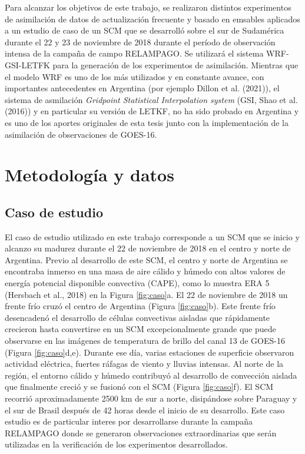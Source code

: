 \documentclass[12pt,oneside]{reedthesis}
\begin{document}
Para alcanzar los objetivos de este trabajo, se realizaron distintos experimentos de asimilación de datos de actualización frecuente y basado en emsables aplicados a un estudio de caso de un SCM que se desarrolló sobre el sur de Sudamérica durante el 22 y 23 de noviembre de 2018 durante el período de observación intensa de la campaña de campo RELAMPAGO. Se utilizará el sistema WRF-GSI-LETFK para la generación de los experimentos de asimilación. Mientras que el modelo WRF es uno de los más utilizados y en constante avance, con importantes antecedentes en Argentina (por ejemplo Dillon et al. (2021)), el sistema de asmilación \emph{Gridpoint Statistical Interpolation system} (GSI, Shao et al. (2016)) y en particular su versión de LETKF, no ha sido probado en Argentina y es uno de los aportes originales de esta tesis junto con la implementación de la asimilación de observaciones de GOES-16.

\hypertarget{metodologuxeda-y-datos}{%
\chapter{Metodología y datos}\label{metodologuxeda-y-datos}}

\hypertarget{caso-de-estudio}{%
\section{Caso de estudio}\label{caso-de-estudio}}

El caso de estudio utilizado en este trabajo corresponde a un SCM que se inicio y alcanzo su madurez durante el 22 de noviembre de 2018 en el centro y norte de Argentina. Previo al desarrollo de este SCM, el centro y norte de Argentina se encontraba inmerso en una masa de aire cálido y húmedo con altos valores de energía potencial disponible convectiva (CAPE), como lo muestra ERA 5 (Hersbach et al., 2018) en la Figura \ref{fig:caso}a. El 22 de noviembre de 2018 un frente frío cruzó el centro de Argentina (Figura \ref{fig:caso}b). Este frente frío desencadenó el desarrollo de células convectivas aisladas que rápidamente crecieron hasta convertirse en un SCM excepcionalmente grande que puede observarse en las imágenes de temperatura de brillo del canal 13 de GOES-16 (Figura \ref{fig:caso}d,e). Durante ese día, varias estaciones de superficie observaron actividad eléctrica, fuertes ráfagas de viento y lluvias intensas. Al norte de la región, el entorno cálido y húmedo contribuyó al desarrollo de convección aislada que finalmente creció y se fusionó con el SCM (Figura \ref{fig:caso}f). El SCM recorrió aproximadamente 2500 km de sur a norte, disipándose sobre Paraguay y el sur de Brasil después de 42 horas desde el inicio de su desarrollo. Este caso estudio es de particular interes por desarrollarse durante la campaña RELAMPAGO donde se generaron observaciones extraordinarias que serán utilizadas en la verificación de los experimentos desarrollados.
\end{document}
